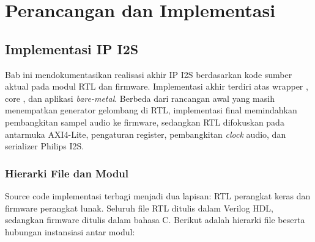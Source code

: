 \chapter{Perancangan dan Implementasi}

\section{Implementasi IP I2S}

Bab ini mendokumentasikan realisasi akhir IP I2S berdasarkan kode sumber aktual pada modul RTL dan firmware. Implementasi akhir terdiri atas wrapper , core , dan aplikasi \textit{bare-metal}. Berbeda dari rancangan awal yang masih menempatkan generator gelombang di RTL, implementasi final memindahkan pembangkitan sampel audio ke firmware, sedangkan RTL difokuskan pada antarmuka AXI4-Lite, pengaturan register, pembangkitan \textit{clock} audio, dan serializer Philips I2S.

\subsection{Hierarki File dan Modul}

Source code implementasi terbagi menjadi dua lapisan: RTL perangkat keras dan firmware perangkat lunak. Seluruh file RTL ditulis dalam Verilog HDL, sedangkan firmware ditulis dalam bahasa C. Berikut adalah hierarki file beserta hubungan instansiasi antar modul:

